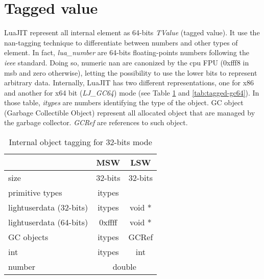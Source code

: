 

\section{Tagged value}
\label{Sec:tagged-value}

LuaJIT represent all internal element as 64-bits \emph{TValue} (tagged value).
It use the nan-tagging technique to differentiate between numbers and other
types of element. In fact, \emph{lua\_number} are 64-bits floating-points numbers
following the \emph{ieee} standard. Doing so, numeric nan are canonized by the
cpu FPU (0xfff8 in msb and zero otherwise), letting the possibility to use the
lower bits to represent arbitrary data. Internally, LuaJIT has two different
representations, one for x86 and another for x64 bit (\emph{LJ\_GC64}) mode
(see Table \ref{tab:tagged-gc32} and \ref{tab:tagged-gc64}). In those table,
\emph{itypes} are numbers identifying the type of the object.
GC object (Garbage Collectible Object) represent all allocated object
that are managed by the garbage collector. \emph{GCRef} are references to such
object.

\begin{table}[H]
\centering
\caption{Internal object tagging for 32-bits mode}
\label{tab:tagged-gc32}
\begin{tabular}{l|c|c|c|}
\cline{2-4}
                                              & \multicolumn{2}{c|}{MSW}         & LSW         \\ \hline
\multicolumn{1}{|l|}{size}                    & \multicolumn{2}{c|}{32-bits}     & 32-bits     \\ \hline
\multicolumn{1}{|l|}{primitive types}         & \multicolumn{2}{c|}{itypes}      &             \\
\multicolumn{1}{|l|}{lightuserdata (32-bits)} & \multicolumn{2}{c|}{itypes}      & void *      \\
\multicolumn{1}{|l|}{lightuserdata (64-bits)} & 0xffff           & \multicolumn{2}{c|}{void *} \\
\multicolumn{1}{|l|}{GC objects}              & \multicolumn{2}{c|}{itypes}      & GCRef       \\
\multicolumn{1}{|l|}{int}                     & \multicolumn{2}{c|}{itypes}      & int         \\
\multicolumn{1}{|l|}{number}                  & \multicolumn{3}{c|}{double}                    \\ \hline
\end{tabular}
\end{table}


